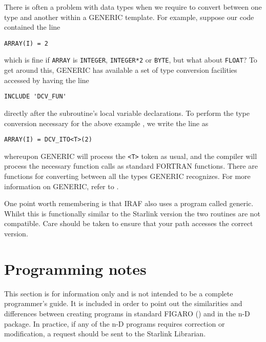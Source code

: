 There is often a problem with data types when we require to convert between
one type and another within a GENERIC template. For example, suppose our
code contained the line


\begin{myquote}
\begin{verbatim}
ARRAY(I) = 2
\end{verbatim}
\end{myquote}

which is fine if {\tt ARRAY} is {\tt INTEGER}, {\tt INTEGER*2} or {\tt BYTE},
but what about {\tt FLOAT}? To get around this, GENERIC has available a set
of type conversion facilities accessed by having the line

\begin{myquote}
\begin{verbatim}
INCLUDE 'DCV_FUN'
\end{verbatim}
\end{myquote}

directly after the subroutine's local variable declarations. To perform the
type conversion necessary for the above example , we write the line as

\begin{myquote}
\begin{verbatim}
ARRAY(I) = DCV_ITO<T>(2)
\end{verbatim}
\end{myquote}

whereupon GENERIC will process the {\tt <T>} token as usual, and the compiler
will process the necessary function calls as standard FORTRAN functions. There
are functions for converting between all the types GENERIC recognizes. For 
more information on GENERIC, refer to 
.

One point worth remembering is that IRAF also uses a program called generic.
Whilst this is functionally similar to the Starlink version the two routines 
are not compatible. Care should be taken to ensure that your path 
accesses the correct version.


\section{Programming notes{}}
\label{notes}

This section is for information only and is not intended to be a complete 
programmer's guide. It is included in order to point out the similarities
and differences between creating programs in standard FIGARO 
() and in the
n-D package. In practice, if any of the n-D programs requires correction
or modification, a request should be sent to the Starlink Librarian.

